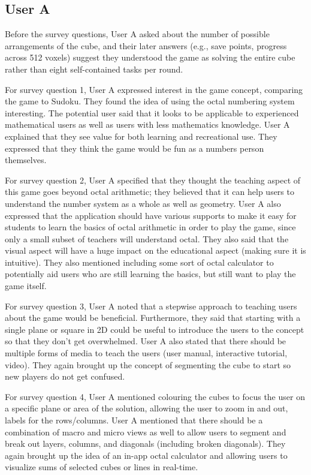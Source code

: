 \documentclass{article}
\begin{document}
\subsection{User A}

Before the survey questions, User A asked about the number of possible arrangements of the cube, and their later answers (e.g., save points, progress across 512 voxels) suggest they understood the game as solving the entire cube rather than eight self-contained tasks per round.

For survey question 1, User A expressed interest in the game concept, comparing the game to Sudoku. They found the idea of using the octal numbering system interesting. The potential user said that it looks to be applicable to experienced mathematical users as well as users with less mathematics knowledge. User A explained that they see value for both learning and recreational use. They expressed that they think the game would be fun as a numbers person themselves.

For survey question 2, User A specified that they thought the teaching aspect of this game goes beyond octal arithmetic; they believed that it can help users to understand the number system as a whole as well as geometry. User A also expressed that the application should have various supports to make it easy for students to learn the basics of octal arithmetic in order to play the game, since only a small subset of teachers will understand octal. They also said that the visual aspect will have a huge impact on the educational aspect (making sure it is intuitive). They also mentioned including some sort of octal calculator to potentially aid users who are still learning the basics, but still want to play the game itself.

For survey question 3, User A noted that a stepwise approach to teaching users about the game would be beneficial. Furthermore, they said that starting with a single plane or square in 2D could be useful to introduce the users to the concept so that they don't get overwhelmed. User A also stated that there should be multiple forms of media to teach the users (user manual, interactive tutorial, video). They again brought up the concept of segmenting the cube to start so new players do not get confused.

For survey question 4, User A mentioned colouring the cubes to focus the user on a specific plane or area of the solution, allowing the user to zoom in and out, labels for the rows/columns. User A mentioned that there should be a combination of macro and micro views as well to allow users to segment and break out layers, columns, and diagonals (including broken diagonals). They again brought up the idea of an in-app octal calculator and allowing users to visualize sums of selected cubes or lines in real-time.
\end{document}
